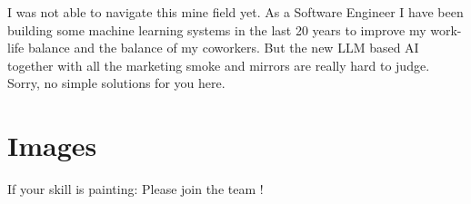 I was not able to navigate this mine field yet. As a Software Engineer I have been building some machine learning systems in the last 20 years to improve my work-life balance and the balance of my coworkers. But the new LLM based AI together with all the marketing smoke and mirrors are really hard to judge. Sorry, no simple solutions for you here.


\section{Images}

If your skill is painting: Please join the team !

